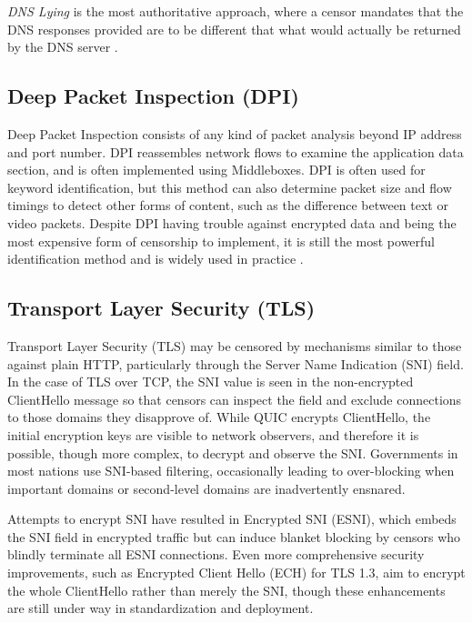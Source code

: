 \textit{DNS Lying} is the most authoritative approach, where a censor mandates that the DNS responses provided are to be different that what would actually be returned by the DNS server \cite{rfc9505}.

\subsection{Deep Packet Inspection (DPI)}

Deep Packet Inspection consists of any kind of packet analysis beyond IP address and port number. DPI reassembles network flows to examine the application data section, and is often implemented using Middleboxes. DPI is often used for keyword identification, but this method can also determine packet size and flow timings to detect other forms of content, such as the difference between text or video packets. Despite DPI having trouble against encrypted data and being the most expensive form of censorship to implement, it is still the most powerful identification method and is widely used in practice \cite{rfc9505}.

\subsection{Transport Layer Security (TLS)}

Transport Layer Security (TLS) may be censored by mechanisms similar to those against plain HTTP, particularly through the Server Name Indication (SNI) field. In the case of TLS over TCP, the SNI value is seen in the non-encrypted ClientHello message so that censors can inspect the field and exclude connections to those domains they disapprove of. While QUIC encrypts ClientHello, the initial encryption keys are visible to network observers, and therefore it is possible, though more complex, to decrypt and observe the SNI. Governments in most nations use SNI-based filtering, occasionally leading to over-blocking when important domains or second-level domains are inadvertently ensnared.

Attempts to encrypt SNI have resulted in Encrypted SNI (ESNI), which embeds the SNI field in encrypted traffic but can induce blanket blocking by censors who blindly terminate all ESNI connections. Even more comprehensive security improvements, such as Encrypted Client Hello (ECH) for TLS 1.3, aim to encrypt the whole ClientHello rather than merely the SNI, though these enhancements are still under way in standardization and deployment.

